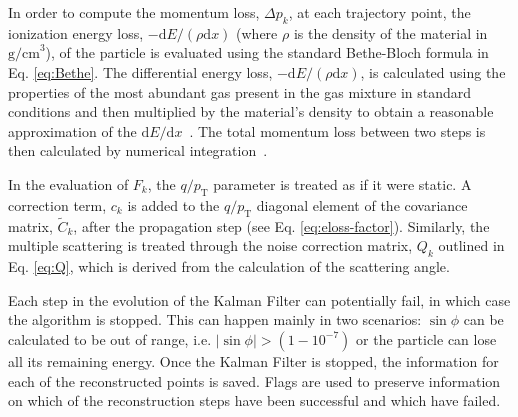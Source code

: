 In order to compute the momentum loss, $\Delta p_k$, at each trajectory point, the ionization energy loss, $-\textrm{d}E/\left(\rho\textrm{d}x\right)$ (where $\rho$ is the density of the material in $\text{g/cm}^3$), of the particle is evaluated using the standard Bethe-Bloch formula in Eq. \ref{eq:Bethe}. The differential energy loss, $-\textrm{d}E/\left(\rho\textrm{d}x\right)$, is calculated using the properties of the most abundant gas present in the gas mixture in standard conditions and then multiplied by the material's density to obtain a reasonable approximation of the $\textrm{d}E/\textrm{d}x$~\cite{STERNHEIMER1984261}. The total momentum loss between two steps is then calculated by numerical integration~\cite{Griffiths2010}. 

In the evaluation of $F_k$, the $q/p_{\text{T}}$ parameter is treated as if it were static. A correction term, $c_k$ is added to the $q/p_{\text{T}}$ diagonal element of the covariance matrix, $\widetilde{C}_k$, after the propagation step (see Eq. \ref{eq:eloss-factor}). Similarly, the multiple scattering is treated through the noise correction matrix, $Q_k$ outlined in Eq. \ref{eq:Q}, which is derived from the calculation of the scattering angle. 

Each step in the evolution of the Kalman Filter can potentially fail, in which case the algorithm is stopped. This can happen mainly in two scenarios: $\sin \phi$ can be calculated to be out of range, i.e. $|\sin \phi|>(1-10^{-7})$ or the particle can lose all its remaining energy. Once the Kalman Filter is stopped, the information for each of the reconstructed points is saved. Flags are used to preserve information on which of the reconstruction steps have been successful and which have failed. 

